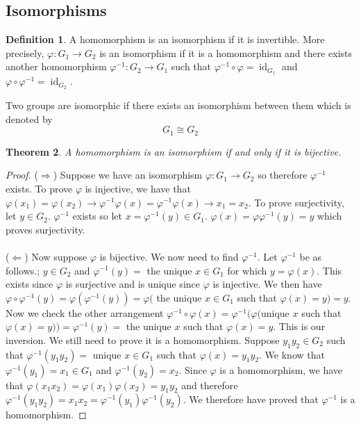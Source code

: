 \documentclass{article}
\DeclareMathOperator{\id}{id}
\newtheorem{theorem}{Theorem}[section]
\theoremstyle{definition}
\newtheorem{definition}[theorem]{Definition}
\begin{document}
\subsection{Isomorphisms}
\begin{definition}
    A homomorphism is an isomorphism if it is invertible. More precisely, $\varphi : G_1 \to G_2$ is an isomorphism if it is a homomorphism and there exists another homomorphism $\varphi ^{-1} : G_2 \to G_1$ such that $\varphi ^{-1} \circ \varphi = \id _{G_1}$ and $\varphi \circ \varphi^{-1} = \id_{G_2}$.
\end{definition}
Two groups are isomorphic if there exists an isomorphism between them which is denoted by 
\begin{equation*}
    G_1 \cong G_2
\end{equation*}
\begin{theorem}
    A homomorphism is an isomorphism if and only if it is bijective.
\end{theorem}
\begin{proof}
    ($\Rightarrow$) Suppose we have an isomorphism $\varphi : G_1 \to G_2$ so therefore $\varphi ^{-1}$ exists. To prove $\varphi$ is injective, we have that $\varphi (x_1)=\varphi (x_2) \rightarrow \varphi^{-1}\varphi(x)=\varphi^{-1}\varphi(x) \rightarrow x_1=x_2$. To prove surjectivity, let $y\in G_2$. $\varphi^{-1}$ exists so let $x=\varphi^{-1}(y) \in G_1$. $\varphi (x) =\varphi \varphi^{-1}(y)=y$ which proves surjectivity. \\\\
    ($\Leftarrow$) Now suppose $\varphi$ is bijective. We now need to find $\varphi ^{-1}$. Let $\varphi ^{-1}$ be as follows.; $y\in G_2$ and $\varphi^{-1} (y) = $ the unique $x\in G_1$ for which $y=\varphi(x)$. This exists since $\varphi $ is surjective and is unique since $\varphi$ is injective. We then have $\varphi \circ \varphi^{-1} (y) = \varphi (\varphi^{-1}(y))=\varphi($ the unique $x\in G_1$ such that $\varphi(x)=y)=y$. Now we check the other arrangement $\varphi ^{-1} \circ \varphi(x) = \varphi^{-1}(\varphi ($unique $x$ such that $\varphi(x)=y)) = \varphi^{-1}(y) = $ the unique $x$ such that $\varphi(x)=y$. This is our inversion. We still need to prove it is a homomorphism. Suppose $y_1 y_2 \in G_2 $ such that $\varphi^{-1} (y_1y_2) = $ unique $x\in G_1$ such that $\varphi(x)=y_1y_2$. We know that $\varphi ^{-1}(y_1) =x_1 \in G_1$ and $\varphi ^{-1}(y_2) =x_2$. Since $\varphi$ is a homomorphism, we have that $\varphi (x_1x_2) = \varphi(x_1)\varphi(x_2) = y_1y_2$ and therefore $\varphi^{-1}(y_1y_2) =x_1x_2 = \varphi ^{-1}(y_1)\varphi^{-1}(y_2)$. We therefore have proved that $\varphi^{-1}$ is a homomorphism.
\end{proof}
\end{document}

